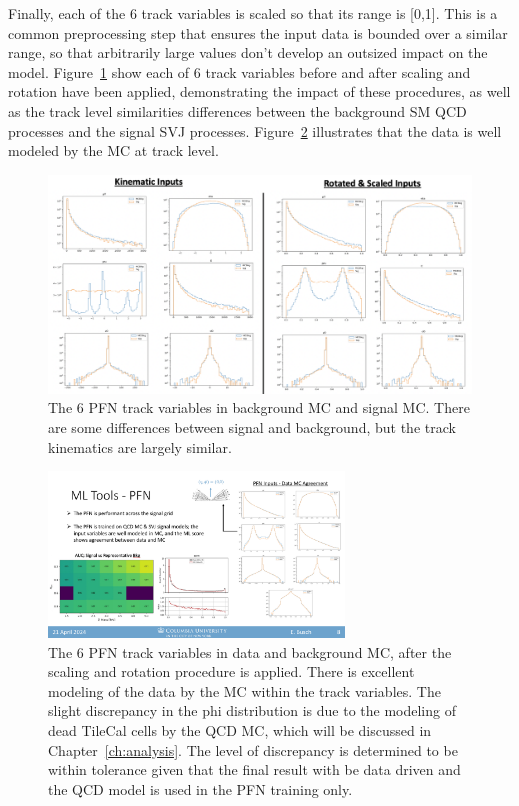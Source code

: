 Finally, each of the 6 track variables is scaled so that its range is [0,1]. This is a common preprocessing step that ensures the input data is bounded over a similar range, so that arbitrarily large values don't develop an outsized impact on the model. Figure~\ref{fig:pfn_bkgsig_input} show each of 6 track variables before and after scaling and rotation have been applied, demonstrating the impact of these procedures, as well as the track level similarities differences between the background SM QCD processes and the signal SVJ processes. Figure~\ref{fig:pfn_datamc_input} illustrates that the data is well modeled by the MC at track level.

\begin{figure}[!htbp]
\centering
   \includegraphics[width=\textwidth]{figures/ml/pfn_bkgsig_input}
    \caption{The 6 PFN track variables in background MC and signal MC. There are some differences between signal and background, but the track kinematics are largely similar. 
     \label{fig:pfn_bkgsig_input}}
\end{figure}

\begin{figure}[!htbp]
\centering
   \includegraphics[width=0.7\textwidth]{figures/ml/pfn_datamc_input}
    \caption{The 6 PFN track variables in data and background MC, after the scaling and rotation procedure is applied. There is excellent modeling of the data by the MC within the track variables. The slight discrepancy in the phi distribution is due to the modeling of dead TileCal cells by the QCD MC, which will be discussed in Chapter~\ref{ch:analysis}. The level of discrepancy is determined to be within tolerance given that the final result with be data driven and the QCD model is used in the PFN training only.
    \label{fig:pfn_datamc_input}}
\end{figure}

